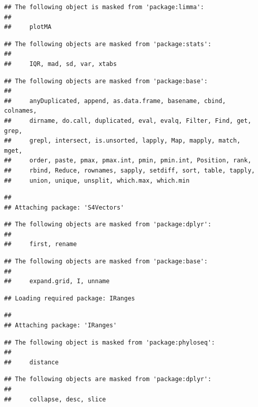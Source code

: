 \documentclass[
]{book}
\begin{document}
\begin{verbatim}
## The following object is masked from 'package:limma':
## 
##     plotMA
\end{verbatim}

\begin{verbatim}
## The following objects are masked from 'package:stats':
## 
##     IQR, mad, sd, var, xtabs
\end{verbatim}

\begin{verbatim}
## The following objects are masked from 'package:base':
## 
##     anyDuplicated, append, as.data.frame, basename, cbind, colnames,
##     dirname, do.call, duplicated, eval, evalq, Filter, Find, get, grep,
##     grepl, intersect, is.unsorted, lapply, Map, mapply, match, mget,
##     order, paste, pmax, pmax.int, pmin, pmin.int, Position, rank,
##     rbind, Reduce, rownames, sapply, setdiff, sort, table, tapply,
##     union, unique, unsplit, which.max, which.min
\end{verbatim}

\begin{verbatim}
## 
## Attaching package: 'S4Vectors'
\end{verbatim}

\begin{verbatim}
## The following objects are masked from 'package:dplyr':
## 
##     first, rename
\end{verbatim}

\begin{verbatim}
## The following objects are masked from 'package:base':
## 
##     expand.grid, I, unname
\end{verbatim}

\begin{verbatim}
## Loading required package: IRanges
\end{verbatim}

\begin{verbatim}
## 
## Attaching package: 'IRanges'
\end{verbatim}

\begin{verbatim}
## The following object is masked from 'package:phyloseq':
## 
##     distance
\end{verbatim}

\begin{verbatim}
## The following objects are masked from 'package:dplyr':
## 
##     collapse, desc, slice
\end{verbatim}
\end{document}
